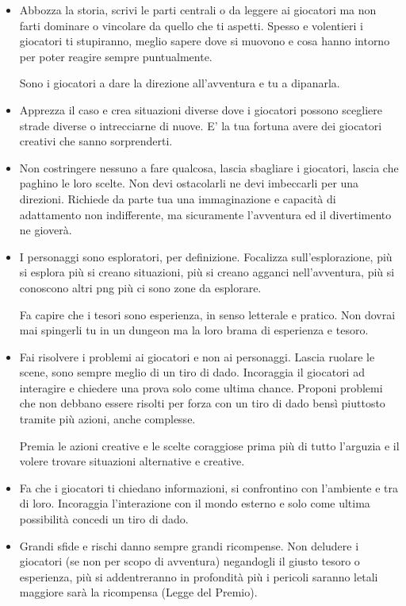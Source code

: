 \begin{multicols}{2}
\begin{itemize}[leftmargin=*]
\item
Abbozza la storia, scrivi le parti centrali o da leggere ai giocatori ma non farti dominare o vincolare da quello che ti aspetti. Spesso e volentieri i giocatori ti stupiranno, meglio sapere dove si muovono e cosa hanno intorno per poter reagire sempre puntualmente.

Sono i giocatori a dare la direzione all'avventura e tu a dipanarla.

\item
Apprezza il caso e crea situazioni diverse dove i giocatori possono scegliere strade diverse o intrecciarne di nuove. E' la tua fortuna avere dei giocatori creativi che sanno sorprenderti.

\item
Non costringere nessuno a fare qualcosa, lascia sbagliare i giocatori, lascia che paghino le loro scelte. Non devi ostacolarli ne devi imbeccarli per una direzioni. Richiede da parte tua una immaginazione e capacità di adattamento non indifferente, ma sicuramente l'avventura ed il divertimento ne gioverà.

\item
I personaggi sono esploratori, per definizione. Focalizza sull'esplorazione, più si esplora più si creano situazioni, più si creano agganci nell'avventura, più si conoscono altri png più ci sono zone da esplorare.

Fa capire che i tesori sono esperienza, in senso letterale e pratico. Non dovrai mai spingerli tu in un dungeon ma la loro brama di esperienza e tesoro.

\item
Fai risolvere i problemi ai giocatori e non ai personaggi. Lascia ruolare le scene, sono sempre meglio di un tiro di dado. Incoraggia il giocatori ad interagire e chiedere una prova solo come ultima chance. Proponi problemi che non debbano essere risolti per forza con un tiro di dado bensì piuttosto tramite più azioni, anche complesse.

Premia le azioni creative e le scelte coraggiose prima più di tutto l'arguzia e il volere trovare situazioni alternative e creative.

\item
Fa che i giocatori ti chiedano informazioni, si confrontino con l'ambiente e tra di loro. Incoraggia l'interazione con il mondo esterno e solo come ultima possibilità concedi un tiro di dado.

\item
Grandi sfide e rischi danno sempre grandi ricompense. Non deludere i giocatori (se non per scopo di avventura) negandogli il giusto tesoro o esperienza, più si addentreranno in profondità più i pericoli saranno letali maggiore sarà la ricompensa (Legge del Premio).


\end{itemize}
\end{multicols}
